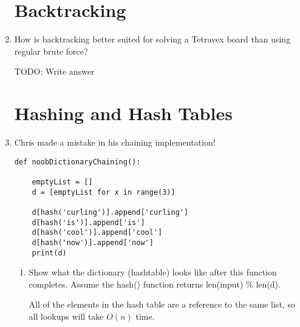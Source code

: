 \documentclass[11pt]{article}
\newenvironment{answer}{\large\lstset{basicstyle=\large}\color{white}}{}
\newenvironment{answer}{\large\lstset{basicstyle=\large}\color{red}}{}
\begin{document}
\begin{enumerate}
\begin{answer}
    \end{answer}

\section*{Backtracking}

\item How is backtracking better suited for solving a Tetravex board than
      using regular brute force?

    \begin{answer}
    \Huge TODO: Write answer
    \end{answer}

\pagebreak
\section*{Hashing and Hash Tables}

\item Chris made a mistake in his chaining implementation!

\begin{lstlisting}
def noobDictionaryChaining():

    emptyList = []
    d = [emptyList for x in range(3)]

    d[hash('curling')].append['curling']
    d[hash('is')].append['is']
    d[hash('cool')].append['cool']
    d[hash('now')].append['now']
    print(d)
\end{lstlisting}

    \begin{enumerate}
    \item Show what the dictionary (hashtable) looks like after this function
          completes. Assume the hash() function returns len(input) \% len(d).

        \begin{answer}
        All of the elements in the hash table are a reference to the same list,
        so all lookups will take $O(n)$ time.
        \vspace{2in}
        \end{answer}


\end{enumerate}
\end{enumerate}
\end{document}
